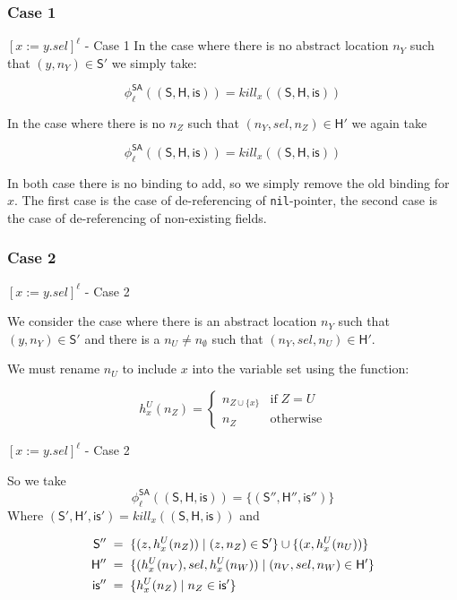 \documentclass[xcolor=svgnames,11pt]{beamer}
\begin{document}
\subsubsection{Case 1}
\begin{frame}{$[x:=y.sel]^\ell$ - Case 1}
In the case where there is no abstract location $n_Y$ such that $(y, n_Y) \in \mathsf{S'}$ we simply take:

$$ \phi_{\ell}^{\mathsf{SA}}(\mathsf{(S, H, is)}) = kill_x (\mathsf{(S,H,is)})$$

\pause
\medskip

In the case where there is no $n_Z$ such that $(n_Y, sel, n_Z) \in \mathsf{H'}$ we again take 

$$ \phi_{\ell}^{\mathsf{SA}}(\mathsf{(S, H, is)}) = kill_x (\mathsf{(S,H,is)})$$

\pause
\medskip

\begin{block}{}
In both case there is no binding to add, so we simply remove the old binding for $x$. The first case is the case of de-referencing of \texttt{nil}-pointer, the second case is the case of de-referencing of non-existing fields.
\end{block}
\end{frame}

\subsubsection{Case 2}
\begin{frame}{$[x:=y.sel]^\ell$ - Case 2}

We consider the case where there is an abstract location $n_Y$ such that $(y, n_Y) \in \mathsf{S'}$ and there is a $n_U \neq n_\emptyset$ such that $(n_Y, sel, n_U) \in \mathsf{H'}$. 

\medskip
\pause

We must rename $n_U$ to include $x$ into the variable set using the function:

$$h_x^U (n_Z) = \left \{
\begin{array}{ll}
n_{Z \cup \{ x \} } & \mathrm{if}\; Z = U \\
n_Z & \mathrm{otherwise}
\end{array}
\right.
$$

\end{frame}

\begin{frame}{$[x:=y.sel]^\ell$ - Case 2}

So we take 
$${\phi}_\ell^{\mathsf{SA}}\mathsf{((S,H,is))} = \{ \mathsf{ (S'',H'',is'') } \} $$
Where $\mathsf{(S', H', is')} = kill_x (\mathsf{(S,H,is)})$ and

\pause

\begin{align*}
\mathsf{S''} \; &= \; \{ (z, h_x^U(n_Z)) \;|\; (z, n_Z) \in \mathsf{S'} \} \cup \{ (x, h_x^U(n_U)) \} \\
\mathsf{H''} \; &= \; \{ (h_x^U(n_V), sel, h_x^U(n_W)) \;|\; (n_V, sel, n_W) \in \mathsf{H'} \} \\
\medskip
\mathsf{is''} \; &= \; \{ h_x^U(n_Z) \;|\; n_Z \in \mathsf{is'} \}
\end{align*}
\end{frame}
\end{document}
